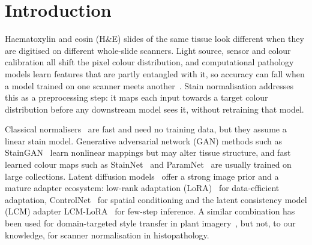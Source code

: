\section{Introduction}
\label{sec:intro}

Haematoxylin and eosin (H\&E) slides of the same tissue look different when they are digitised on
different whole-slide scanners. Light source, sensor and colour calibration all shift the pixel colour
distribution, and computational pathology models learn features that are partly entangled with it, so
accuracy can fall when a model trained on one scanner meets another~\cite{breen2024gans}. Stain
normalisation addresses this as a preprocessing step: it maps each input towards a target colour
distribution before any downstream model sees it, without retraining that model.

Classical normalisers~\cite{macenko2009normalisation,reinhard2001colortransfer} are fast and need no
training data, but they assume a linear stain model. Generative adversarial network (GAN) methods such as
StainGAN~\cite{shaban2019staingan} learn nonlinear mappings but may alter tissue structure, and fast
learned colour maps such as StainNet~\cite{kang2021stainnet} and ParamNet~\cite{kang2024paramnet} are
usually trained on large collections. Latent diffusion models~\cite{rombach2022ldm} offer a strong image
prior and a mature adapter ecosystem: low-rank adaptation (LoRA)~\cite{hu2021lora} for data-efficient adaptation,
ControlNet~\cite{zhang2023controlnet} for spatial conditioning and the latent consistency model (LCM) adapter LCM-LoRA~\cite{luo2023lcmlora} for
few-step inference. A similar combination has been used for domain-targeted style transfer in plant
imagery~\cite{hartley2024plant}, but not, to our knowledge, for scanner normalisation in histopathology.

